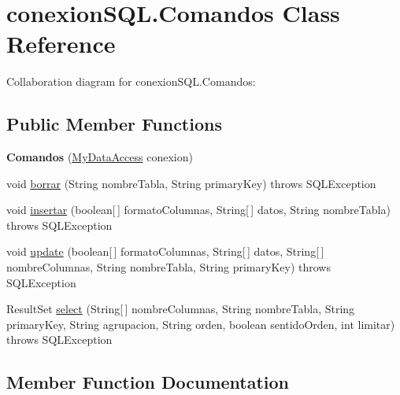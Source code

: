 \hypertarget{classconexion_s_q_l_1_1_comandos}{}\section{conexion\+S\+Q\+L.\+Comandos Class Reference}
\label{classconexion_s_q_l_1_1_comandos}


Collaboration diagram for conexion\+S\+Q\+L.\+Comandos\+:
\subsection*{Public Member Functions}
\begin{DoxyCompactItemize}
\item 
\mbox{\label{classconexion_s_q_l_1_1_comandos_a9198892a41e99577789c9091deb4e23f}} 
{\bfseries Comandos} (\mbox{\hyperlink{classconexion_s_q_l_1_1_my_data_access}{My\+Data\+Access}} conexion)
\item 
void \mbox{\hyperlink{classconexion_s_q_l_1_1_comandos_a1a53c5650458c357ecd43cfc2734ad83}{borrar}} (String nombre\+Tabla, String primary\+Key)  throws S\+Q\+L\+Exception 
\item 
void \mbox{\hyperlink{classconexion_s_q_l_1_1_comandos_a2fb20845cbfb01a03b1aba60031608cb}{insertar}} (boolean\mbox{[}$\,$\mbox{]} formato\+Columnas, String\mbox{[}$\,$\mbox{]} datos, String nombre\+Tabla)  throws S\+Q\+L\+Exception 
\item 
void \mbox{\hyperlink{classconexion_s_q_l_1_1_comandos_af07c35c78a263c1a1ffb4661f1829e20}{update}} (boolean\mbox{[}$\,$\mbox{]} formato\+Columnas, String\mbox{[}$\,$\mbox{]} datos, String\mbox{[}$\,$\mbox{]} nombre\+Columnas, String nombre\+Tabla, String primary\+Key)  throws S\+Q\+L\+Exception 
\item 
Result\+Set \mbox{\hyperlink{classconexion_s_q_l_1_1_comandos_aa1dc46cfa52b931d7252da826880372d}{select}} (String\mbox{[}$\,$\mbox{]} nombre\+Columnas, String nombre\+Tabla, String primary\+Key, String agrupacion, String orden, boolean sentido\+Orden, int limitar)  throws S\+Q\+L\+Exception 
\end{DoxyCompactItemize}


\subsection{Member Function Documentation}
\mbox{\label{classconexion_s_q_l_1_1_comandos_a1a53c5650458c357ecd43cfc2734ad83}} 
